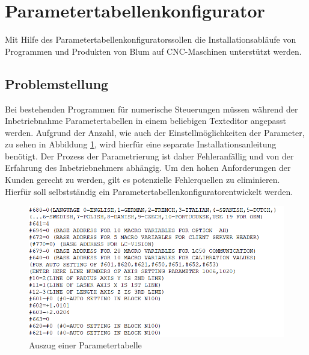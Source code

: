 \section{Parametertabellenkonfigurator}
Mit Hilfe des \glqq Parametertabellenkonfigurators\grqq\space sollen die Installationsabläufe von Programmen und Produkten von Blum auf CNC-Maschinen unterstützt werden.
\subsection{Problemstellung}
Bei bestehenden Programmen für numerische Steuerungen müssen während der Inbetriebnahme Parametertabellen in einem beliebigen Texteditor angepasst werden. Aufgrund der Anzahl, wie auch der Einstellmöglichkeiten der Parameter, zu sehen in Abbildung \ref{fig:Paratab}, wird hierfür eine separate Installationsanleitung benötigt. Der Prozess der Parametrierung ist daher Fehleranfällig und von der Erfahrung des Inbetriebnehmers abhängig. Um den hohen Anforderungen der Kunden gerecht zu werden, gilt es potenzielle Fehlerquellen zu eliminieren. Hierfür soll selbstständig ein \glqq Parametertabellenkonfigurator\grqq\space entwickelt werden.
\begin{figure}[H]
\includegraphics[scale=0.7]{pictures_and_research/Bilder/Paratab.PNG}
\caption{Auszug einer Parametertabelle}
\label{fig:Paratab}
\end{figure}
